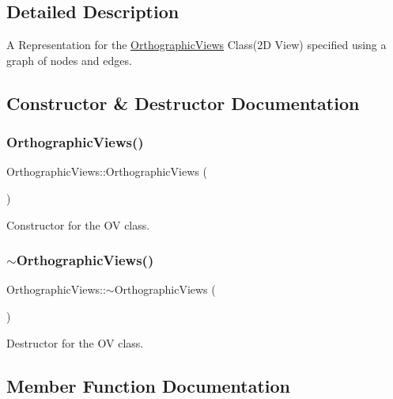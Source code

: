 \subsection{Detailed Description}
A Representation for the \mbox{\hyperlink{class_orthographic_views}{Orthographic\+Views}} Class(2\+D View) specified using a graph of nodes and edges. 

\subsection{Constructor \& Destructor Documentation}
\mbox{\label{class_orthographic_views_a4698ffe80819cb2106f61a336590256a}} 
\subsubsection{\texorpdfstring{Orthographic\+Views()}{OrthographicViews()}}
{\footnotesize\ttfamily Orthographic\+Views\+::\+Orthographic\+Views (\begin{DoxyParamCaption}{ }\end{DoxyParamCaption})}



Constructor for the OV class. 

\mbox{\label{class_orthographic_views_ab6d622dcf326ace286b1bfea8cbdb75e}} 
\subsubsection{\texorpdfstring{$\sim$\+Orthographic\+Views()}{~OrthographicViews()}}
{\footnotesize\ttfamily Orthographic\+Views\+::$\sim$\+Orthographic\+Views (\begin{DoxyParamCaption}{ }\end{DoxyParamCaption})}



Destructor for the OV class. 



\subsection{Member Function Documentation}
\mbox{\label{class_orthographic_views_a81792a7d224bada0a04d0917cc5d7a53}} 
